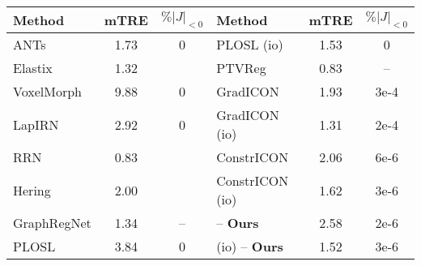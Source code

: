 	\noindent\begin{minipage}{0.59\textwidth}
		\centering
		\begin{small}
			\label{tab:dirlab}
			\begin{tabular}{@{}lcc|lcc@{}}
				\toprule
				\textbf{Method}                              & \textbf{mTRE} & $\%|J|_{<0}$ &
				\textbf{Method}                              & \textbf{mTRE} & $\%|J|_{<0}$                                                        \\
				\midrule
				ANTs    \cite{avants2008symmetric}           & 1.73          & 0            & PLOSL (io)                             & 1.53 & 0    \\
				Elastix \cite{klein2009elastix}              & 1.32          &              & PTVReg \cite{vishnevskiy2017isotropic} & 0.83 & --   \\
				VoxelMorph \cite{balakrishnan2019voxelmorph} & 9.88          & 0            & GradICON     \cite{tian2022}           & 1.93 & 3e-4 \\
				LapIRN     \cite{mok2020large}               & 2.92          & 0            & GradICON (io)                          & 1.31 & 2e-4 \\
				RRN           \cite{he2021recursive}         & 0.83          &              & ConstrICON \cite{greer2021icon}        & 2.06 & 6e-6 \\
				Hering \etal      \cite{hering2021cnn}       & 2.00          &              & ConstrICON (io)                        & 1.62 & 3e-6 \\
				GraphRegNet \cite{hansen2021graphregnet}     & 1.34          & --           & \text{CARL} -- \textbf{Ours}           & 2.58 & 2e-6 \\
				PLOSL \cite{wang2022plosl}                   & 3.84          & 0            & \text{CARL} (io) -- \textbf{Ours}      & 1.52 & 3e-6 \\
				\bottomrule
			\end{tabular}
		\end{small}
	\end{minipage}


